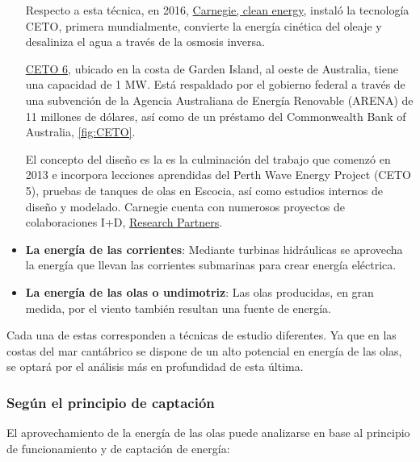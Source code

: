 \begin{itemize}
  Respecto a esta técnica, en 2016,
  \href{https://www.carnegiece.com/wave/}{Carnegie, clean energy},
  instaló la tecnología CETO, primera mundialmente, convierte la energía
  cinética del oleaje y desaliniza el agua a través de la osmosis
  inversa.

  \href{https://www.carnegiece.com/project/ceto-6-garden-island/}{CETO
  6}, ubicado en la costa de Garden Island, al oeste de Australia, tiene
  una capacidad de 1 MW. Está respaldado por el gobierno federal a
  través de una subvención de la Agencia Australiana de Energía
  Renovable (ARENA) de 11 millones de dólares, así como de un préstamo
  del Commonwealth Bank of Australia, \autoref{fig:CETO}.

  El concepto del diseño es la es la culminación del trabajo que comenzó
  en 2013 e incorpora lecciones aprendidas del Perth Wave Energy Project
  (CETO 5), pruebas de tanques de olas en Escocia, así como estudios
  internos de diseño y modelado. Carnegie cuenta con numerosos proyectos
  de colaboraciones I+D,
  \href{https://www.carnegiece.com/partner/research-partners/}{Research
  Partners}.
\item
  \textbf{La energía de las corrientes}: Mediante turbinas hidráulicas
  se aprovecha la energía que llevan las corrientes submarinas para
  crear energía eléctrica.
\item
  \textbf{La energía de las olas o undimotriz}: Las olas producidas, en
  gran medida, por el viento también resultan una fuente de energía.
\end{itemize}

Cada una de estas corresponden a técnicas de estudio diferentes. Ya que
en las costas del mar cantábrico se dispone de un alto potencial en
energía de las olas, se optará por el análisis más en profundidad de
esta última.

\subsubsection{Según el principio de captación}\label{header-n85}

El aprovechamiento de la energía de las olas puede analizarse en base al
principio de funcionamiento y de captación de energía:

